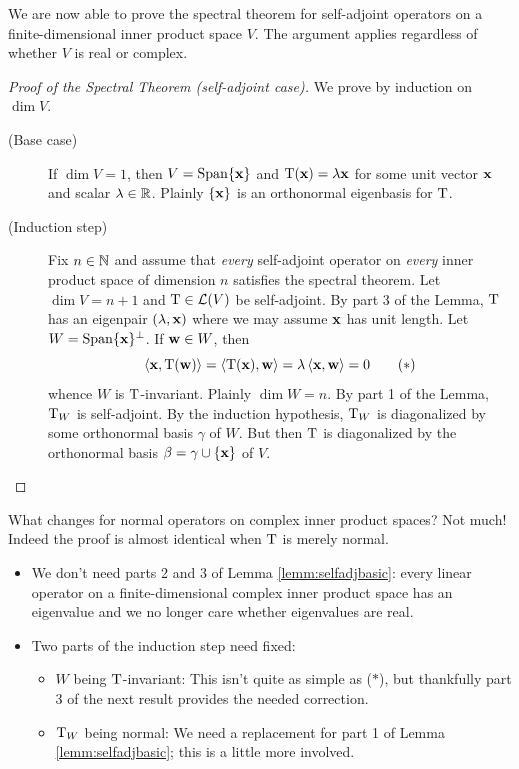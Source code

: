 We are now able to prove the spectral theorem for self-adjoint operators on a finite-dimensional inner product space $V$. The argument applies regardless of whether $V$ is real or complex.

\begin{proof}[Proof of the Spectral Theorem (self-adjoint case)]
	We prove by induction on $\dim V$.
	\begin{description}
		\item[\normalfont(Base case)] If $\dim V=1$, then $V=\operatorname{Span}\{{\mathbf{x}}\}$ and $\mathrm{T}({\mathbf{x}})=\lambda{\mathbf{x}}$ for some unit vector ${\mathbf{x}}$ and scalar $\lambda\in\mathbb{R}$. Plainly $\{{\mathbf{x}}\}$ is an orthonormal eigenbasis for $\mathrm{T}$.
		\item[\normalfont(Induction step)] Fix $n\in\mathbb{N}$ and assume that \emph{every} self-adjoint operator on \emph{every} inner product space of dimension $n$ satisfies the spectral theorem. Let $\dim V=n+1$ and $\mathrm{T}\in\mathcal{L}(V)$ be self-adjoint.	By part 3 of the Lemma, $\mathrm{T}$ has an eigenpair $(\lambda,{\mathbf{x}})$ where we may assume ${\mathbf{x}}$ has unit length. Let $W=\operatorname{Span}\{{\mathbf{x}}\}^\perp$. If ${\mathbf{w}}\in W$, then
	\[
		\left\langle {\mathbf{x}},\mathrm{T}({\mathbf{w}})\right\rangle=\left\langle \mathrm{T}({\mathbf{x}}),{\mathbf{w}}\right\rangle=\lambda\left\langle {\mathbf{x}},{\mathbf{w}}\right\rangle=0\tag{$\ast$}
	\]
	whence $W$ is $\mathrm{T}$-invariant. Plainly $\dim W=n$. By part 1 of the Lemma, $\mathrm{T}_{W}$ is self-adjoint. By the induction hypothesis, $\mathrm{T}_{W}$ is diagonalized by some orthonormal basis $\gamma$ of $W$. But then  $\mathrm{T}$ is diagonalized by the orthonormal basis $\beta=\gamma\cup\{{\mathbf{x}}\}$ of $V$.\qedhere
	\end{description}
\end{proof}


\pagebreak[3]



What changes for normal operators on complex inner product spaces? Not much! Indeed the proof is almost identical when $\mathrm{T}$ is merely normal.
\begin{itemize}
  \item We don't need parts 2 and 3 of Lemma \ref{lemm:selfadjbasic}: every linear operator on a finite-dimensional complex inner product space has an eigenvalue and we no longer care whether eigenvalues are real.
  \item Two parts of the induction step need fixed:
  \begin{itemize}
    \item $W$ being $\mathrm{T}$-invariant: This isn't quite as simple as ($\ast$), but thankfully part 3 of the next result provides the needed correction.
    \item $\mathrm{T}_{W}$ being normal: We need a replacement for part 1 of Lemma \ref{lemm:selfadjbasic}; this is a little more involved.
	\end{itemize}
\end{itemize}

